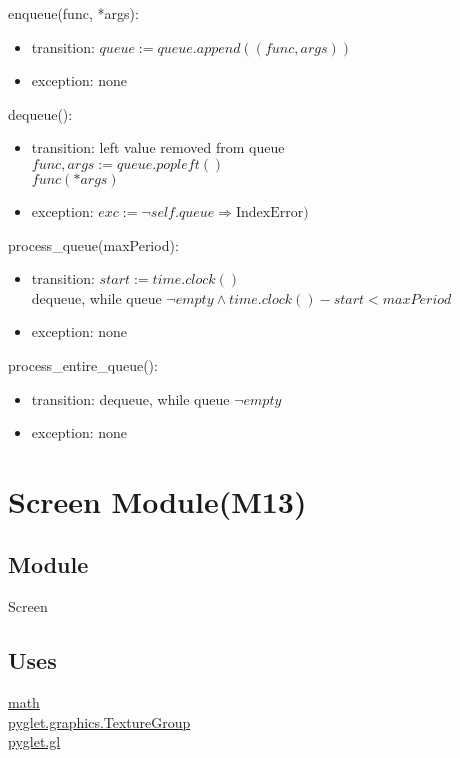 \documentclass{article}
\begin{document}
\noindent enqueue(func, *args):
\begin{itemize}
\item transition: $queue := queue.append((func, args))$ 
\item exception: none
\end{itemize}\vspace{6mm}

\noindent dequeue():
\begin{itemize}
\item transition: left value removed from queue\\
    $func, args := queue.popleft()$\\
    $func(*args)$
\item exception: $exc := \neg self.queue \Rightarrow \text{IndexError})$
\end{itemize}\vspace{6mm}

\noindent process\_queue(maxPeriod):
\begin{itemize}
\item transition: $start := time.clock()$ \\
    dequeue, while queue $\neg empty \land time.clock() - start < maxPeriod$
\item exception: none
\end{itemize}\vspace{6mm}

\noindent process\_entire\_queue():
\begin{itemize}
\item transition: dequeue, while queue $\neg empty$
\item exception: none
\end{itemize}\vspace{6mm}

\newpage


\section {Screen Module(M13)}

\subsection{Module}
Screen

\subsection {Uses}
\href{https://docs.python.org/3/library/math.html}{math}\\
\href{https://pyglet.readthedocs.io/en/latest/modules/graphics/#pyglet.graphics.TextureGroup}{pyglet.graphics.TextureGroup}\\
\href{https://pyglet.readthedocs.io/en/latest/modules/gl.html}{pyglet.gl}
\end{document}
